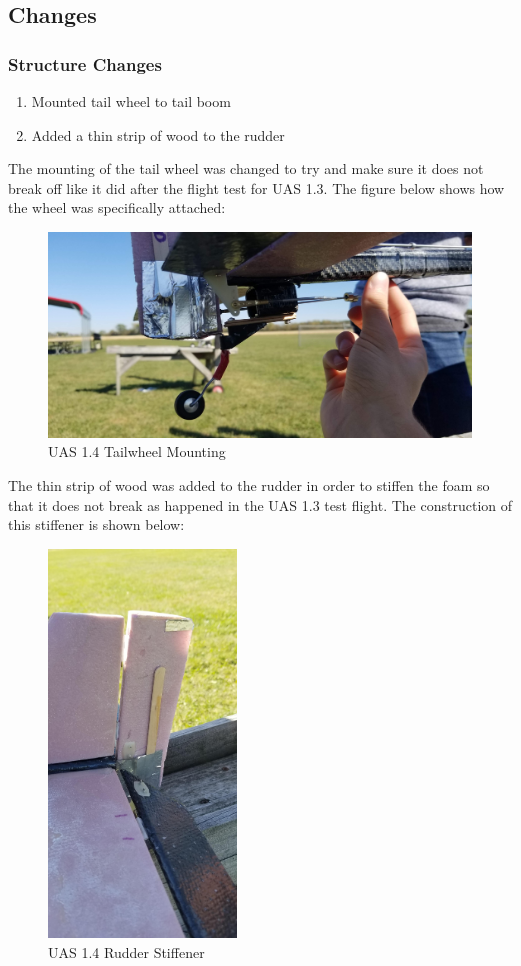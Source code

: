 \documentclass{article}
\begin{document}
\subsection*{Changes}
\subsubsection*{Structure Changes}
\begin{enumerate}
\item Mounted tail wheel to tail boom
\item Added a thin strip of wood to the rudder
\end{enumerate} 
The mounting of the tail wheel was changed to try and make sure it does not break off like it did after the flight test for UAS 1.3. The figure below shows how the wheel was specifically attached: \\
\begin{figure}[H]
\includegraphics[angle = 180, width = \columnwidth]{UAS1_4_Tailwheel.jpg}
\caption{UAS 1.4 Tailwheel Mounting}
\end{figure}

The thin strip of wood was added to the rudder in order to stiffen the foam so that it does not break as happened in the UAS 1.3 test flight. The construction of this stiffener is shown below: \\
\begin{figure}[H]
\includegraphics[angle = 270, width = 5cm]{UAS1_4_RudderStiffener.jpg}
\caption{UAS 1.4 Rudder Stiffener}
\end{figure}
\end{document}
